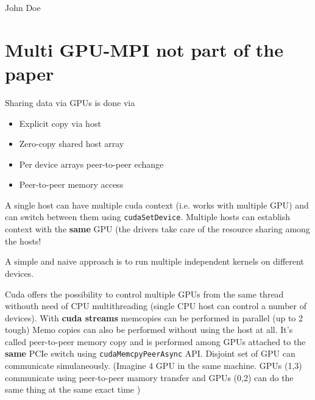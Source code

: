 \documentclass[conference]{IEEEtran}
\begin{document}
\begin{IEEEbiography}{John Doe}
\blindtext
\end{IEEEbiography}





\section{Multi GPU-MPI not part of the paper}
Sharing data via GPUs is done via
\begin{itemize}
	\item Explicit copy via host
	\item Zero-copy shared host array
	\item Per device arrays peer-to-peer echange
	\item Peer-to-peer memory access
\end{itemize}
A single host can have multiple cuda context (i.e. works with multiple GPU) and can switch between them using \texttt{cudaSetDevice}.
Multiple hosts can establish context with the \textbf{same} GPU (the drivers take care of the resource sharing among the hosts!

A simple and naive approach is to run multiple independent kernels on different devices.

Cuda offers the possibility to control multiple GPUs from the same thread withouth need of CPU multithreading (single CPU host can control a number of devices).
With \textbf{cuda streams} memcopies can be performed in parallel (up to 2 tough)
Memo copies can also be performed without using the host at all. It's called peer-to-peer memory copy and is performed among GPUs attached to the \textbf{same} PCIe switch using \texttt{cudaMemcpyPeerAsync} API. 
Disjoint set of GPU can communicate simulaneously. (Imagine 4 GPU in the same machine. GPUs (1,3) communicate using peer-to-peer mamory transfer and GPUs (0,2) can do the same thing at the same exact time )
\end{document}
